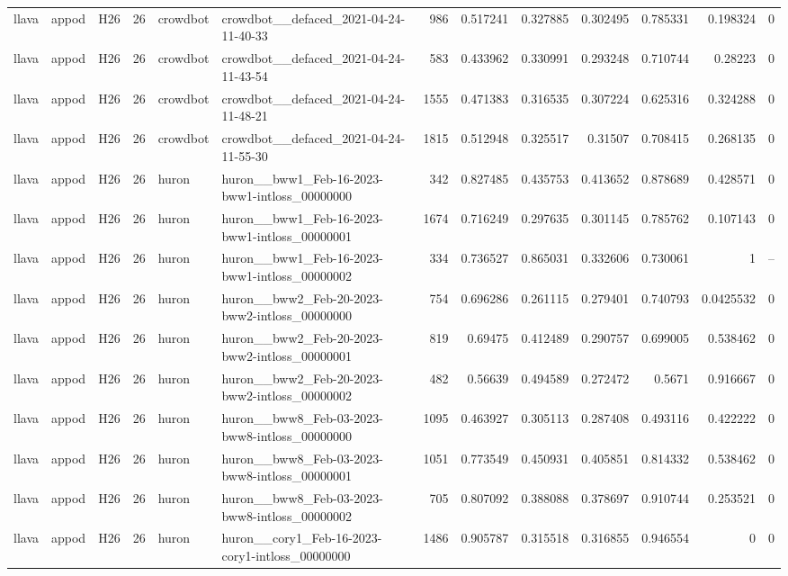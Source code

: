 \begin{longtable}{lllrllrrrrrrr}
llava & appod & H26 & 26 & crowdbot & crowdbot\_\_defaced\_2021-04-24-11-40-33 & 986 & 0.517241 & 0.327885 & 0.302495 & 0.785331 & 0.198324 & 0 \\
llava & appod & H26 & 26 & crowdbot & crowdbot\_\_defaced\_2021-04-24-11-43-54 & 583 & 0.433962 & 0.330991 & 0.293248 & 0.710744 & 0.28223 & 0 \\
llava & appod & H26 & 26 & crowdbot & crowdbot\_\_defaced\_2021-04-24-11-48-21 & 1555 & 0.471383 & 0.316535 & 0.307224 & 0.625316 & 0.324288 & 0 \\
llava & appod & H26 & 26 & crowdbot & crowdbot\_\_defaced\_2021-04-24-11-55-30 & 1815 & 0.512948 & 0.325517 & 0.31507 & 0.708415 & 0.268135 & 0 \\
llava & appod & H26 & 26 & huron & huron\_\_bww1\_Feb-16-2023-bww1-intloss\_00000000 & 342 & 0.827485 & 0.435753 & 0.413652 & 0.878689 & 0.428571 & 0 \\
llava & appod & H26 & 26 & huron & huron\_\_bww1\_Feb-16-2023-bww1-intloss\_00000001 & 1674 & 0.716249 & 0.297635 & 0.301145 & 0.785762 & 0.107143 & 0 \\
llava & appod & H26 & 26 & huron & huron\_\_bww1\_Feb-16-2023-bww1-intloss\_00000002 & 334 & 0.736527 & 0.865031 & 0.332606 & 0.730061 & 1 & -- \\
llava & appod & H26 & 26 & huron & huron\_\_bww2\_Feb-20-2023-bww2-intloss\_00000000 & 754 & 0.696286 & 0.261115 & 0.279401 & 0.740793 & 0.0425532 & 0 \\
llava & appod & H26 & 26 & huron & huron\_\_bww2\_Feb-20-2023-bww2-intloss\_00000001 & 819 & 0.69475 & 0.412489 & 0.290757 & 0.699005 & 0.538462 & 0 \\
llava & appod & H26 & 26 & huron & huron\_\_bww2\_Feb-20-2023-bww2-intloss\_00000002 & 482 & 0.56639 & 0.494589 & 0.272472 & 0.5671 & 0.916667 & 0 \\
llava & appod & H26 & 26 & huron & huron\_\_bww8\_Feb-03-2023-bww8-intloss\_00000000 & 1095 & 0.463927 & 0.305113 & 0.287408 & 0.493116 & 0.422222 & 0 \\
llava & appod & H26 & 26 & huron & huron\_\_bww8\_Feb-03-2023-bww8-intloss\_00000001 & 1051 & 0.773549 & 0.450931 & 0.405851 & 0.814332 & 0.538462 & 0 \\
llava & appod & H26 & 26 & huron & huron\_\_bww8\_Feb-03-2023-bww8-intloss\_00000002 & 705 & 0.807092 & 0.388088 & 0.378697 & 0.910744 & 0.253521 & 0 \\
llava & appod & H26 & 26 & huron & huron\_\_cory1\_Feb-16-2023-cory1-intloss\_00000000 & 1486 & 0.905787 & 0.315518 & 0.316855 & 0.946554 & 0 & 0 \\

\end{longtable}
